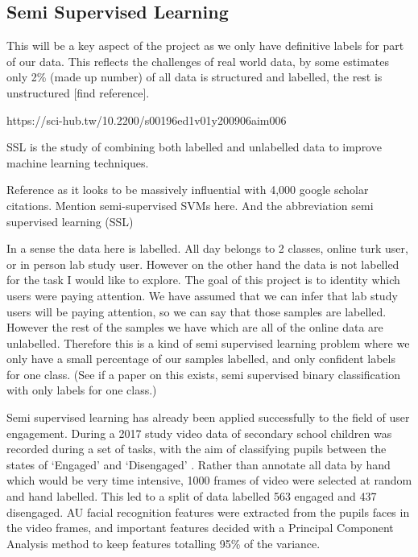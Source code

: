 \documentclass{article}
\begin{document}


\subsection{Semi Supervised Learning}
This will be a key aspect of the project as we only have definitive labels for part of our data.
This reflects the challenges of real world data, by some estimates only 2\% (made up number) of all data is structured and labelled, the rest is unstructured [find reference].

https://sci-hub.tw/10.2200/s00196ed1v01y200906aim006

SSL is the study of combining both labelled and unlabelled data to improve machine learning techniques.

Reference \cite{zhu2005semi} as it looks to be massively influential with 4,000 google scholar citations.
Mention semi-supervised SVMs here. 
And the abbreviation semi supervised learning (SSL)


In a sense the data here is labelled.
All day belongs to 2 classes, online turk user, or in person lab study user.
However on the other hand the data is not labelled for the task I would like to explore.
The goal of this project is to identity which users were paying attention.
We have assumed that we can infer that lab study users will be paying attention, so we can say that those samples are labelled.
However the rest of the samples we have which are all of the online data are unlabelled.
Therefore this is a kind of semi supervised learning problem where we only have a small percentage of our samples labelled, and only confident labels for one class.
(See if a paper on this exists, semi supervised binary classification with only labels for one class.)

Semi supervised learning has already been applied successfully to the field of user engagement.
During a 2017 study video data of secondary school children was recorded during a set of tasks, with the aim of classifying pupils between the states of `Engaged' and `Disengaged' \cite{nezami2017semi}.
Rather than annotate all data by hand which would be very time intensive, 1000 frames of video were selected at random and hand labelled.
This led to a split of data labelled 563 engaged and 437 disengaged.
AU facial recognition features were extracted from the pupils faces in the video frames, and important features decided with a Principal Component Analysis method to keep features totalling 95\% of the variance.
\end{document}
